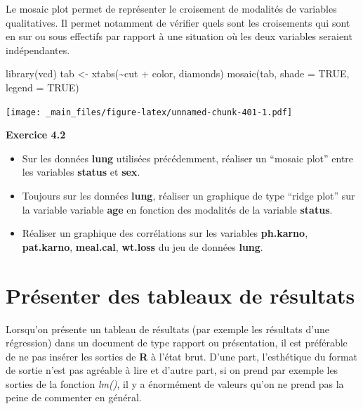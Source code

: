 \documentclass[
]{book}
\newenvironment{Shaded}{\begin{snugshade}}{\end{snugshade}}
\newcommand{\AttributeTok}[1]{\textcolor[rgb]{0.77,0.63,0.00}{#1}}
\newcommand{\ConstantTok}[1]{\textcolor[rgb]{0.00,0.00,0.00}{#1}}
\newcommand{\FunctionTok}[1]{\textcolor[rgb]{0.00,0.00,0.00}{#1}}
\newcommand{\NormalTok}[1]{#1}
\newcommand{\OtherTok}[1]{\textcolor[rgb]{0.56,0.35,0.01}{#1}}
\newcommand{\SpecialCharTok}[1]{\textcolor[rgb]{0.00,0.00,0.00}{#1}}
\theoremstyle{definition}
\theoremstyle{definition}
\theoremstyle{definition}
\theoremstyle{definition}
\theoremstyle{remark}
\begin{document}
Le mosaic plot permet de représenter le croisement de modalités de variables qualitatives. Il permet notamment de vérifier quels sont les croisements qui sont en sur ou sous effectifs par rapport à une situation où les deux variables seraient indépendantes.

\begin{Shaded}
\begin{Highlighting}[]
\FunctionTok{library}\NormalTok{(vcd)}
\NormalTok{tab }\OtherTok{\textless{}{-}} \FunctionTok{xtabs}\NormalTok{(}\SpecialCharTok{\textasciitilde{}}\NormalTok{cut }\SpecialCharTok{+}\NormalTok{ color, diamonds)}
\FunctionTok{mosaic}\NormalTok{(tab, }
       \AttributeTok{shade =} \ConstantTok{TRUE}\NormalTok{,}
       \AttributeTok{legend =} \ConstantTok{TRUE}\NormalTok{)}
\end{Highlighting}
\end{Shaded}

\texttt{[image: \_main\_files/figure-latex/unnamed-chunk-401-1.pdf]}

\textbf{Exercice 4.2}

\begin{itemize}
\item
  Sur les données \textbf{lung} utilisées précédemment, réaliser un ``mosaic plot'' entre les variables \textbf{status} et \textbf{sex}.
\item
  Toujours sur les données \textbf{lung}, réaliser un graphique de type ``ridge plot'' sur la variable variable \textbf{age} en fonction des modalités de la variable \textbf{status}.
\item
  Réaliser un graphique des corrélations sur les variables \textbf{ph.karno}, \textbf{pat.karno}, \textbf{meal.cal}, \textbf{wt.loss} du jeu de données \textbf{lung}.
\end{itemize}

\hypertarget{pruxe9senter-des-tableaux-de-ruxe9sultats}{%
\section{Présenter des tableaux de résultats}\label{pruxe9senter-des-tableaux-de-ruxe9sultats}}

Lorsqu'on présente un tableau de résultats (par exemple les résultats d'une régression) dans un document de type rapport ou présentation, il est préférable de ne pas insérer les sorties de \textbf{R} à l'état brut. D'une part, l'esthétique du format de sortie n'est pas agréable à lire et d'autre part, si on prend par exemple les sorties de la fonction \emph{lm()}, il y a énormément de valeurs qu'on ne prend pas la peine de commenter en général.
\end{document}
